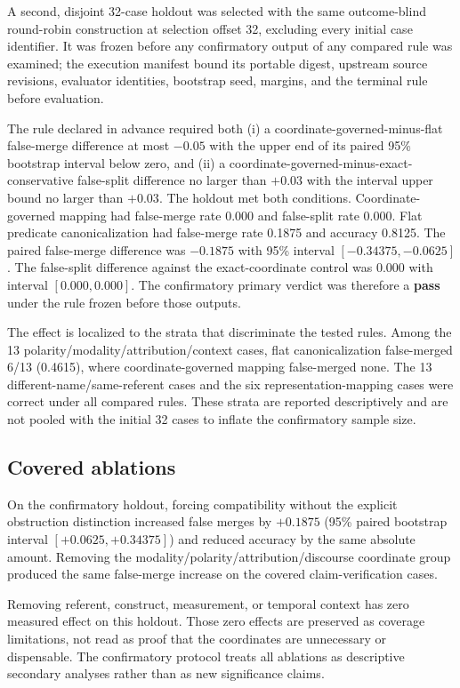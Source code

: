 A second, disjoint 32-case holdout was selected with the same outcome-blind
round-robin construction at selection offset 32, excluding every initial case
identifier. It was frozen before any confirmatory output of any compared rule
was examined; the execution manifest bound its portable digest, upstream
source revisions, evaluator identities, bootstrap seed, margins, and the
terminal rule before evaluation.

The rule declared in advance required both (i) a coordinate-governed-minus-flat
false-merge difference at most $-0.05$ with the upper end of its paired 95\%
bootstrap interval below zero, and (ii) a
coordinate-governed-minus-exact-conservative false-split difference no larger
than $+0.03$ with the interval upper bound no larger than $+0.03$. The holdout
met both conditions. Coordinate-governed mapping had false-merge rate 0.000
and false-split rate 0.000. Flat predicate canonicalization had false-merge
rate 0.1875 and accuracy 0.8125. The paired false-merge difference was
$-0.1875$ with 95\% interval $[-0.34375,-0.0625]$. The false-split difference
against the exact-coordinate control was 0.000 with interval $[0.000,0.000]$.
The confirmatory primary verdict was therefore a \textbf{pass} under the rule
frozen before those outputs.

The effect is localized to the strata that discriminate the tested rules.
Among the 13 polarity/modality/attribution/context cases, flat
canonicalization false-merged 6/13 (0.4615), where coordinate-governed mapping
false-merged none. The 13 different-name/same-referent cases and the six
representation-mapping cases were correct under all compared rules. These
strata are reported descriptively and are not pooled with the initial 32 cases
to inflate the confirmatory sample size.

\subsection{Covered ablations}

On the confirmatory holdout, forcing compatibility without the explicit
obstruction distinction increased false merges by $+0.1875$ (95\% paired
bootstrap interval $[+0.0625,+0.34375]$) and reduced accuracy by the same
absolute amount. Removing the modality/polarity/attribution/discourse
coordinate group produced the same false-merge increase on the covered
claim-verification cases.

Removing referent, construct, measurement, or temporal context has zero
measured effect on this holdout. Those zero effects are preserved as coverage
limitations, not read as proof that the coordinates are unnecessary or
dispensable. The confirmatory protocol treats all ablations as descriptive
secondary analyses rather than as new significance claims.

